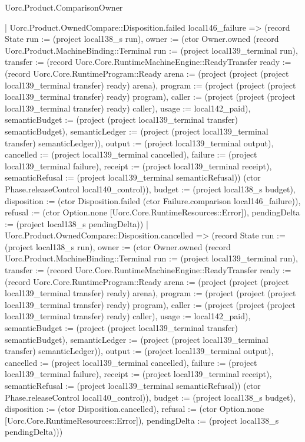 \begin{lexlean}{Uorc.Product.ComparisonOwner}
\begin{semanticmodule}
{    | Uorc.Product.OwnedCompare::Disposition.failed local146_failure => (record State {run := (project local138_s run), owner := (ctor Owner.owned (record Uorc.Product.MachineBinding::Terminal {run := (project local139_terminal run), transfer := (record Uorc.Core.RuntimeMachineEngine::ReadyTransfer {ready := (record Uorc.Core.RuntimeProgram::Ready {arena := (project (project (project local139_terminal transfer) ready) arena), program := (project (project (project local139_terminal transfer) ready) program), caller := (project (project (project local139_terminal transfer) ready) caller), usage := local142_paid}), semanticBudget := (project (project local139_terminal transfer) semanticBudget), semanticLedger := (project (project local139_terminal transfer) semanticLedger)}), output := (project local139_terminal output), cancelled := (project local139_terminal cancelled), failure := (project local139_terminal failure), receipt := (project local139_terminal receipt), semanticRefusal := (project local139_terminal semanticRefusal)}) (ctor Phase.releaseControl local140_control)), budget := (project local138_s budget), disposition := (ctor Disposition.failed (ctor Failure.comparison local146_failure)), refusal := (ctor Option.none [Uorc.Core.RuntimeResources::Error]), pendingDelta := (project local138_s pendingDelta)})
    | Uorc.Product.OwnedCompare::Disposition.cancelled => (record State {run := (project local138_s run), owner := (ctor Owner.owned (record Uorc.Product.MachineBinding::Terminal {run := (project local139_terminal run), transfer := (record Uorc.Core.RuntimeMachineEngine::ReadyTransfer {ready := (record Uorc.Core.RuntimeProgram::Ready {arena := (project (project (project local139_terminal transfer) ready) arena), program := (project (project (project local139_terminal transfer) ready) program), caller := (project (project (project local139_terminal transfer) ready) caller), usage := local142_paid}), semanticBudget := (project (project local139_terminal transfer) semanticBudget), semanticLedger := (project (project local139_terminal transfer) semanticLedger)}), output := (project local139_terminal output), cancelled := (project local139_terminal cancelled), failure := (project local139_terminal failure), receipt := (project local139_terminal receipt), semanticRefusal := (project local139_terminal semanticRefusal)}) (ctor Phase.releaseControl local140_control)), budget := (project local138_s budget), disposition := (ctor Disposition.cancelled), refusal := (ctor Option.none [Uorc.Core.RuntimeResources::Error]), pendingDelta := (project local138_s pendingDelta)}))
}


\end{semanticmodule}
\end{lexlean}
